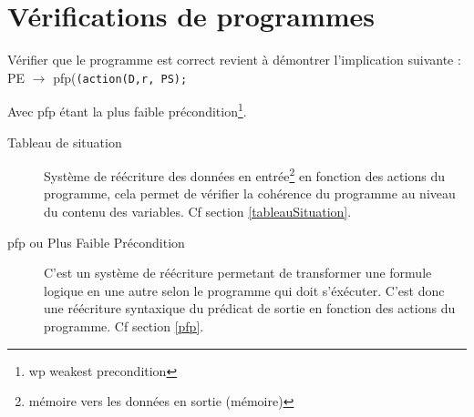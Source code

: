 \chapter{Vérifications de programmes}
\minitoc
	Vérifier que le programme est correct revient à démontrer l'implication suivante :\\ PE $\rightarrow$ pfp(\texttt{(action(D,r, PS);}

	Avec pfp étant la plus faible précondition\footnote{wp weakest precondition}.
	\begin{description}
		\item[Tableau de situation] Système de réécriture des données en entrée\footnote{mémoire vers les données en sortie (mémoire)} en fonction des
			actions du programme, cela permet de vérifier la cohérence du programme au niveau du contenu des variables. Cf section \ref{tableauSituation}.
		\item[pfp ou Plus Faible Précondition]	C'est un système de réécriture permetant de transformer une formule logique en une autre selon le programme qui doit s'éxécuter.
			C'est donc une réécriture syntaxique du prédicat de sortie en fonction des actions du programme. Cf section \ref{pfp}.
	\end{description}
